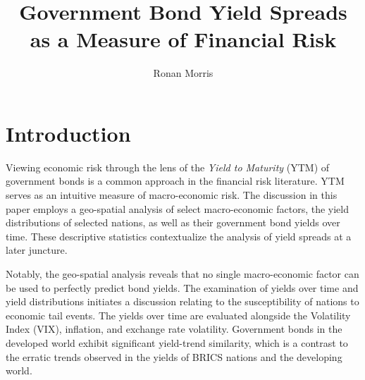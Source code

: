 \documentclass[11pt,preprint, authoryear]{elsarticle}
\numberwithin{equation}{section}
\numberwithin{figure}{section}
\numberwithin{table}{section}
\begin{document}
\begin{frontmatter}  %

\title{Government Bond Yield Spreads as a Measure of Financial Risk}





\author[Add1]{Ronan Morris}





\address[Add1]{Stellenbosch University}



\vspace{1cm}





\vspace{0.5cm}

\end{frontmatter}

\setcounter{footnote}{0}



\pagestyle{fancy}
\chead{}
\rhead{}
\lfoot{}
\lhead{}
\cfoot{}


\headsep 35pt %




\hypertarget{introduction}{%
\section{Introduction}\label{introduction}}

Viewing economic risk through the lens of the \emph{Yield to Maturity}
(YTM) of government bonds is a common approach in the financial risk
literature. YTM serves as an intuitive measure of macro-economic risk.
The discussion in this paper employs a geo-spatial analysis of select
macro-economic factors, the yield distributions of selected nations, as
well as their government bond yields over time. These descriptive
statistics contextualize the analysis of yield spreads at a later
juncture.

Notably, the geo-spatial analysis reveals that no single macro-economic
factor can be used to perfectly predict bond yields. The examination of
yields over time and yield distributions initiates a discussion relating
to the susceptibility of nations to economic tail events. The yields
over time are evaluated alongside the Volatility Index (VIX), inflation,
and exchange rate volatility. Government bonds in the developed world
exhibit significant yield-trend similarity, which is a contrast to the
erratic trends observed in the yields of BRICS nations and the
developing world.
\end{document}
